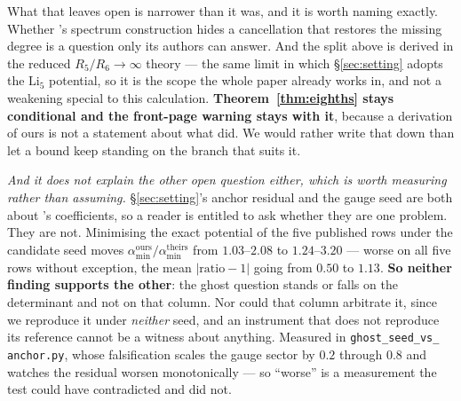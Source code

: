 \documentclass[11pt,a4paper]{article}
\newcommand{\amin}{\alpha_{\min}}
\begin{document}
\begin{itemize}
What that leaves open is narrower than it was, and it is worth naming exactly. Whether
\cite{KM25}'s spectrum construction hides a cancellation that restores the missing degree is a
question only its authors can answer. And the split above is derived in the reduced
$R_5/R_6\to\infty$ theory --- the same limit in which \S\ref{sec:setting} adopts the
$\mathrm{Li}_5$ potential, so it is the scope the whole paper already works in, and not a
weakening special to this calculation. \textbf{Theorem~\ref{thm:eighths} stays conditional and the
front-page warning stays with it}, because a derivation of ours is not a statement about what
\cite{KM25} did. We would rather write that down than let a bound keep standing on the branch that
suits it.

\emph{And it does not explain the other open question either, which is worth measuring rather than
assuming.} \S\ref{sec:setting}'s anchor residual and the gauge seed are both about \cite{KM25}'s
coefficients, so a reader is entitled to ask whether they are one problem. They are not. Minimising
the exact potential of the five published rows under the candidate seed moves
$\amin^{\text{ours}}/\amin^{\text{theirs}}$ from $1.03$--$2.08$ to $1.24$--$3.20$ --- worse on all
five rows without exception, the mean $|\text{ratio}-1|$ going from $0.50$ to $1.13$.
\textbf{So neither finding supports the other}: the ghost question stands or falls on the
determinant and not on that column. Nor could that column arbitrate it, since we reproduce it under
\emph{neither} seed, and an instrument that does not reproduce its reference cannot be a witness
about anything. Measured in \texttt{ghost\_\allowbreak seed\_\allowbreak vs\_\allowbreak
anchor.py}, whose falsification scales the gauge sector by $0.2$ through $0.8$ and watches the
residual worsen monotonically --- so ``worse'' is a measurement the test could have contradicted
and did not.


\end{itemize}
\end{document}
